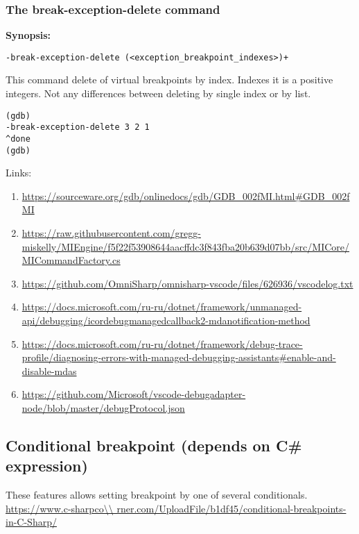 \documentclass[a4paper,12pt]{article}
\newenvironment{nobr}{\begin{minipage}{\textwidth}\setlength\parskip{1em}
}{\end{minipage}\ignorespacesafterend}
\begin{document}
\subsubsection{The break-exception-delete command}

\textbf{Synopsis:}

\begin{nobr}
\begin{lstlisting}[style=cplusplus,numbers=none]
-break-exception-delete (<exception_breakpoint_indexes>)+
\end{lstlisting}
\end{nobr}

This command delete of virtual breakpoints by index. Indexes it is a positive integers. Not any differences between deleting by single index or by list. 

\begin{nobr}
\begin{lstlisting}[style=cplusplus,title=\lstinline|Example|,numbers=none]
(gdb)
-break-exception-delete 3 2 1
^done
(gdb)
\end{lstlisting}
\end{nobr}

Links:
\begin{enumerate}
 \item \url{https://sourceware.org/gdb/onlinedocs/gdb/GDB_002fMI.html#GDB_002fMI}
 \item \url{https://raw.githubusercontent.com/gregg-miskelly/MIEngine/f5f22f53908644aacffdc3f843fba20b639d07bb/src/MICore/MICommandFactory.cs}
 \item \url{https://github.com/OmniSharp/omnisharp-vscode/files/626936/vscodelog.txt}
 \item \url{https://docs.microsoft.com/ru-ru/dotnet/framework/unmanaged-api/debugging/icordebugmanagedcallback2-mdanotification-method}
 \item \url{https://docs.microsoft.com/ru-ru/dotnet/framework/debug-trace-profile/diagnosing-errors-with-managed-debugging-assistants#enable-and-disable-mdas}
 \item \url{https://github.com/Microsoft/vscode-debugadapter-node/blob/master/debugProtocol.json}
\end{enumerate}

\subsection{Conditional breakpoint (depends on C\# expression)}

These features allows setting breakpoint by one of several conditionals. \url{https://www.c-sharpco\\
rner.com/UploadFile/b1df45/conditional-breakpoints-in-C-Sharp/}
\end{document}
